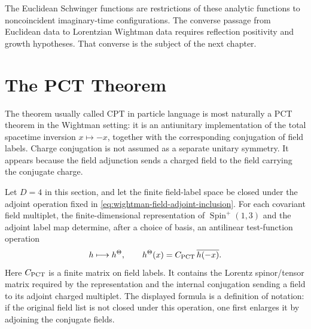 The Euclidean Schwinger functions are restrictions of these analytic functions
to noncoincident imaginary-time configurations.  The converse passage from
Euclidean data to Lorentzian Wightman data requires reflection positivity and
growth hypotheses.  That converse is the subject of the next chapter.

\section{The PCT Theorem}
\label{sec:wightman-pct-theorem}

The theorem usually called CPT in particle language is most naturally a PCT
theorem in the Wightman setting: it is an antiunitary implementation of the
total spacetime inversion \(x\mapsto -x\), together with the corresponding
conjugation of field labels.  Charge conjugation is not assumed as a separate
unitary symmetry.  It appears because the field adjunction sends a charged
field to the field carrying the conjugate charge.

Let \(D=4\) in this section, and let the finite field-label space be closed
under the adjoint operation fixed in
\eqref{eq:wightman-field-adjoint-inclusion}.  For each covariant field
multiplet, the finite-dimensional representation of
\(\operatorname{Spin}^+(1,3)\) and the adjoint label map determine, after a
choice of basis, an antilinear test-function operation
\[
  h\longmapsto h^\Theta,
  \qquad
  h^\Theta(x)=C_{\rm PCT}\,\overline{h(-x)} .
\]
Here \(C_{\rm PCT}\) is a finite matrix on field labels.  It contains the
Lorentz spinor/tensor matrix required by the representation and the internal
conjugation sending a field to its adjoint charged multiplet.  The displayed
formula is a definition of notation: if the original field list is not closed
under this operation, one first enlarges it by adjoining the conjugate fields.

